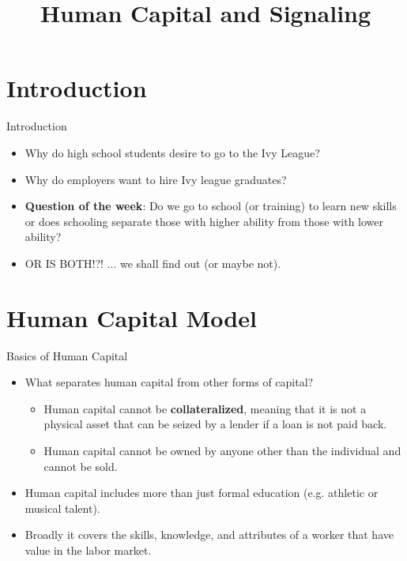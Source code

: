 \documentclass{beamer}
\title{Human Capital and Signaling}
\begin{document}
\maketitle
\section{Introduction}
\frame{\sectionpage}
\begin{frame}[<+->]{Introduction}
    \begin{itemize}
        \item Why do high school students desire to go to the Ivy League?
        \item Why do employers want to hire Ivy league graduates?
        \item \textbf{Question of the week}: Do we go to school (or training) to learn new skills or does schooling separate those with higher ability from those with lower ability? 
        \item OR IS BOTH!?! ... we shall find out (or maybe not). 
    \end{itemize}
    
\end{frame}


\section{Human Capital Model}
\frame{\sectionpage}
\begin{frame}[<+->]{Basics of Human Capital}
	\begin{itemize}
	    \item What separates human capital from other forms of capital?
	
    	\begin{itemize}
    	    \item Human capital cannot be \textbf{collateralized}, meaning that it is not a physical asset that can be seized by a lender if a loan is not paid back.
    	    \item Human capital cannot be owned by anyone other than the individual and cannot be sold.
    	\end{itemize}
        \item Human capital includes more than just formal education (e.g. athletic or musical talent).
        \item Broadly it covers the skills, knowledge, and attributes of a worker that have value in the labor market.
    \end{itemize}
\end{frame}
\end{document}
